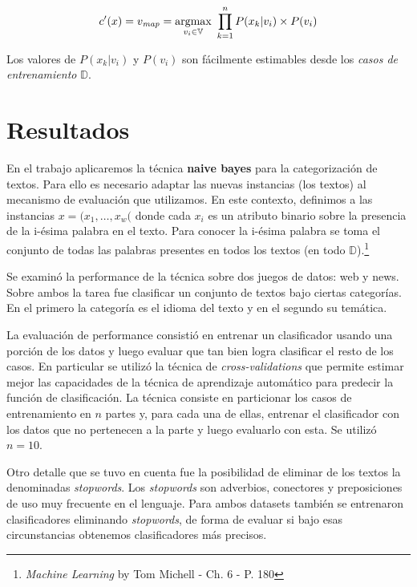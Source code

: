 \documentclass[a4paper,10pt]{article}
\begin{document}
\begin{equation}
  c'(x) = v_{\text{\emph{map}}} = \underset{v_i \in \mathbb{V}}{\text{argmax}}\ \prod^{n}_{k=1} P(x_k | v_i) \times P(v_i)
\end{equation}

Los valores de $P(x_k | v_i)$ y $P(v_i)$ son fácilmente estimables desde los \emph{casos de entrenamiento} $\mathbb{D}$.

\section{Resultados}

En el trabajo aplicaremos la técnica \textbf{naive bayes} para la categorización de textos. Para ello es necesario adaptar las nuevas instancias (los textos) al mecanismo de evaluación que utilizamos. En este contexto, definimos a las instancias $x = (x_1, \dots, x_w($ donde cada $x_i$ es un atributo binario sobre la presencia de la i-ésima palabra en el texto. Para conocer la i-ésima palabra se toma el conjunto de todas las palabras presentes en todos los textos (en todo $\mathbb{D}$).\footnote{\emph{Machine Learning} by Tom Michell - Ch. 6 - P. 180}

Se examinó la performance de la técnica sobre dos juegos de datos: \textsf{web} y \textsf{news}. Sobre ambos la tarea fue clasificar un conjunto de textos bajo ciertas categorías. En el primero la categoría es el idioma del texto y en el segundo su temática. 

La evaluación de performance consistió en entrenar un clasificador usando una porción de los datos y luego evaluar que tan bien logra clasificar el resto de los casos. En particular se utilizó la técnica de \emph{cross-validations} que permite estimar mejor las capacidades de la técnica de aprendizaje automático para predecir la función de clasificación. La técnica consiste en particionar los casos de entrenamiento en $n$ partes y, para cada una de ellas, entrenar el clasificador con los datos que no pertenecen a la parte y luego evaluarlo con esta. Se utilizó $n = 10$.

Otro detalle que se tuvo en cuenta fue la posibilidad de eliminar de los textos la denominadas \emph{stopwords}. Los \emph{stopwords} son adverbios, conectores y preposiciones de uso muy frecuente en el lenguaje. Para ambos datasets también se entrenaron clasificadores eliminando \emph{stopwords}, de forma de evaluar si bajo esas circunstancias obtenemos clasificadores más precisos.
\end{document}
